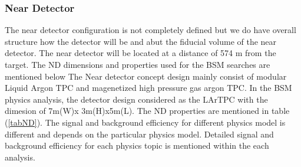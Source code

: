 \subsubsection{Near Detector}
The near detector configuration is not completely defined but we do have overall structure how the detector will be and abut the fiducial volume of the near detector. The near detector will be located at a distance of 574 m from the target. The ND dimensions and properties used for the BSM searches are mentioned below
The Near detector concept design mainly consist of modular Liquid Argon TPC and magenetized high pressure gas argon TPC. In the BSM physics analysis, the detector design considered as the LArTPC with the dimesion of 7m(W)x 3m(H)x5m(L). The ND properties are mentioned in table (\ref{tabND}). The signal and background efficiency for different physics model is different and depends on the particular physics model. Detailed signal and background efficiency for each physics topic is mentioned within the each analysis.

\begin{table}[h]
    \begin{center}
        \end{center}
        \caption{\label{tabND}ND properties used for the analysis }
    \end{table} 
